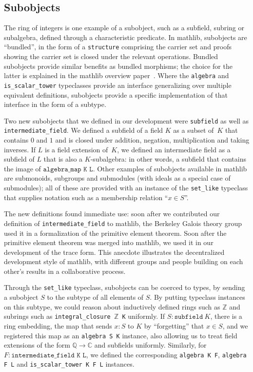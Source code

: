 \documentclass[sn-mathphys]{sn-jnl}%
\renewcommand{\C}{\mathbb{C}}
\newcommand{\lean}[1]{\texttt{#1}\xspace}
\newcommand{\mathlib}{\textsf{mathlib}\xspace}
\newcommand{\QQ}{\mathbb{Q}}
\renewcommand{\Z}{\mathbb{Z}}
\begin{document}
\subsection{Subobjects} \label{sec:subobjects}

The ring of integers is one example of a subobject, such as a subfield, subring or subalgebra, defined through a characteristic predicate.
In \mathlib, subobjects are ``bundled'', in the form of a \lean{structure} comprising the carrier set and proofs showing the carrier set is closed under the relevant operations.
Bundled subobjects provide similar benefits as bundled morphisms; the choice for the latter is explained in the \mathlib overview paper~\cite{mathlib}.
Where the \lean{algebra} and \lean{is\_scalar\_tower} typeclasses provide an interface generalizing over multiple equivalent definitions, subobjects provide a specific implementation of that interface in the form of a subtype.

Two new subobjects that we defined in our development were \lean{subfield} as well as \lean{intermediate\_field}. We defined a subfield of a field $K$ as a subset of~$K$ that contains $0$ and $1$ and is closed under addition, negation, multiplication and taking inverses.
If $L$ is a field extension of~$K$, we defined an intermediate field as a subfield of $L$ that is also a $K$-subalgebra: in other words, a subfield that contains the image of $\lean{algebra\_map K L}$.
Other examples of subobjects available in \mathlib are submonoids, subgroups and submodules (with ideals as a special case of submodules);
all of these are provided with an instance of the \lean{set\_like} typeclass that supplies notation such as a membership relation ``$x \in S$''.

The new definitions found immediate use:
soon after we contributed our definition of \lean{intermediate\_field} to \mathlib,
the Berkeley Galois theory group used it in a formalization of the primitive element theorem.
Soon after the primitive element theorem was merged into \mathlib,
we used it in our development of the trace form.
This anecdote illustrates the decentralized development style of \mathlib,
with different groups and people building on each other's results in a collaborative process.

Through the \lean{set\_like} typeclass, subobjects can be coerced to types, by sending a subobject $S$ to the subtype of all elements of $S$.
By putting typeclass instances on this subtype,
we could reason about inductively defined rings such as $\Z$ and subrings such as \lean{integral\_closure $\Z$ K} uniformly.
If $S : \lean{subfield}\ K$, there is a ring embedding, the map that sends $x : S$ to $K$ by ``forgetting'' that $x \in S$,
and we registered this map as an \lean{algebra S K} instance, also allowing us to treat field extensions of the form $\QQ \to \C$ and subfields uniformly.
Similarly, for $F : \lean{intermediate\_field K L}$, we defined the corresponding \lean{algebra K F}, \lean{algebra F L} and \lean{is\_scalar\_tower K F L} instances.
\end{document}
